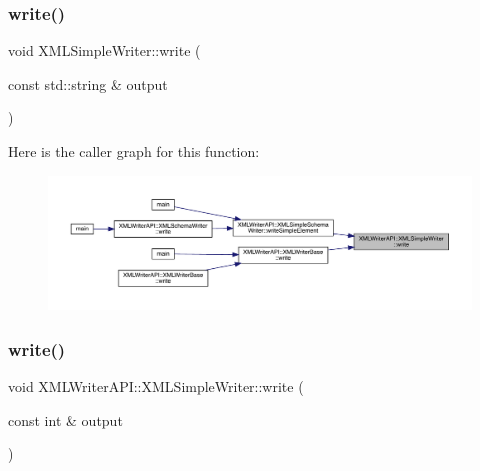 \mbox{\label{classXMLWriterAPI_1_1XMLSimpleWriter_aea3a2b15335f16a80149d21976e3afa2}} 
\subsubsection{\texorpdfstring{write()}{write()}\hspace{0.1cm}{\footnotesize\ttfamily [2/20]}}
{\footnotesize\ttfamily void X\+M\+L\+Simple\+Writer\+::write (\begin{DoxyParamCaption}\item[{const std\+::string \&}]{output }\end{DoxyParamCaption})}

Here is the caller graph for this function\+:\nopagebreak
\begin{figure}[H]
\begin{center}
\leavevmode
\includegraphics[width=350pt]{d5/de1/classXMLWriterAPI_1_1XMLSimpleWriter_aea3a2b15335f16a80149d21976e3afa2_icgraph}
\end{center}
\end{figure}
\mbox{\label{classXMLWriterAPI_1_1XMLSimpleWriter_a2a072319bedcf9fe4ebe991ecd549b56}} 
\subsubsection{\texorpdfstring{write()}{write()}\hspace{0.1cm}{\footnotesize\ttfamily [3/20]}}
{\footnotesize\ttfamily void X\+M\+L\+Writer\+A\+P\+I\+::\+X\+M\+L\+Simple\+Writer\+::write (\begin{DoxyParamCaption}\item[{const int \&}]{output }\end{DoxyParamCaption})}

